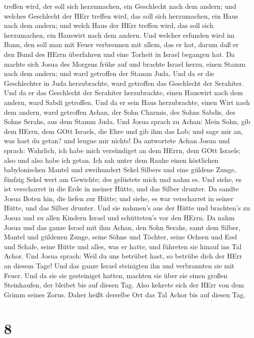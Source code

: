 treffen wird, der soll sich herzumachen, ein Geschlecht nach dem andern;
und welches Geschlecht der HErr treffen wird, das soll sich herzumachen,
ein Haus nach dem andern; und welch Haus der HErr treffen wird, das soll
sich herzumachen, ein Hauswirt nach dem andern.  Und
welcher erfunden wird im Bann, den soll man mit Feuer verbrennen mit
allem, das er hat, darum daß er den Bund des HErrn überfahren und eine
Torheit in Israel begangen hat.  Da machte sich Josua des
Morgens frühe auf und brachte Israel herzu, einen Stamm nach dem andern;
und ward getroffen der Stamm Juda.  Und da er die
Geschlechter in Juda herzubrachte, ward getroffen das Geschlecht der
Serahiter. Und da er das Geschlecht der Serahiter herzubrachte, einen
Hauswirt nach dem andern, ward Sabdi getroffen.  Und da er
sein Haus herzubrachte, einen Wirt nach dem andern, ward getroffen
Achan, der Sohn Charmis, des Sohns Sabdis, des Sohns Serahs, aus dem
Stamm Juda.  Und Josua sprach zu Achan: Mein Sohn, gib dem
HErrn, dem GOtt Israels, die Ehre und gib ihm das Lob; und sage mir an,
was hast du getan? und leugne mir nichts!  Da antwortete
Achan Josua und sprach: Wahrlich, ich habe mich versündiget an dem
HErrn, dem GOtt Israels; also und also habe ich getan.  Ich
sah unter dem Rauhe einen köstlichen babylonischen Mantel und
zweihundert Sekel Silbers und eine güldene Zunge, fünfzig Sekel wert am
Gewichte; des gelüstete mich und nahm es. Und siehe, es ist verscharret
in die Erde in meiner Hütte, und das Silber drunter.  Da
sandte Josua Boten hin, die liefen zur Hütte; und siehe, es war
verscharret in seiner Hütte, und das Silber drunter.  Und
sie nahmen's aus der Hütte und brachten's zu Josua und zu allen Kindern
Israel und schütteten's vor den HErrn.  Da nahm Josua und
das ganze Israel mit ihm Achan, den Sohn Serahs, samt dem Silber, Mantel
und güldenen Zunge, seine Söhne und Töchter, seine Ochsen und Esel und
Schafe, seine Hütte und alles, was er hatte, und führeten sie hinauf ins
Tal Achor.  Und Josua sprach: Weil du uns betrübet hast, so
betrübe dich der HErr an diesem Tage! Und das ganze Israel steinigten
ihn und verbrannten sie mit Feuer. Und da sie sie gesteiniget hatten,
 machten sie über sie einen großen Steinhaufen, der bleibet
bis auf diesen Tag. Also kehrete sich der HErr von dem Grimm seines
Zorns. Daher heißt derselbe Ort das Tal Achor bis auf diesen Tag.

\hypertarget{section-7}{%
\section{8}\label{section-7}}

